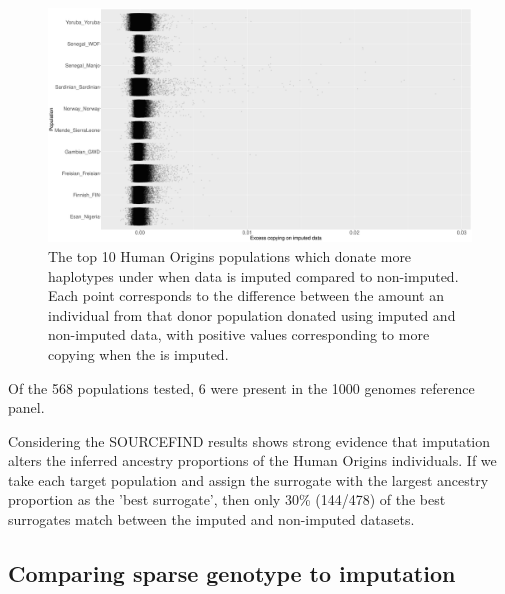  \begin{figure}[htp]
    \centering
    \includegraphics[width=1.0\textwidth]{../images/chapter3/imputed_excess_copying_pops.png}
    \caption{The top 10 Human Origins populations which donate more haplotypes under when data is imputed compared to non-imputed. Each point corresponds to the difference between the amount an individual from that donor population donated using imputed and non-imputed data, with positive values corresponding to more copying when the is imputed.}
    \label{fig:imputed_excess_copying_pops}
\end{figure}

Of the 568 populations tested, 6 were present in the 1000 genomes reference panel. 

Considering the SOURCEFIND results shows strong evidence that imputation alters the inferred ancestry proportions of the Human Origins individuals. If we take each target population and assign the surrogate with the largest ancestry proportion as the 'best surrogate', then only 30\% (144/478) of the best surrogates match between the imputed and non-imputed datasets. 

\subsection{Comparing sparse genotype to imputation}









